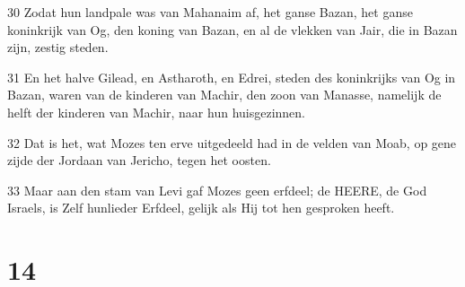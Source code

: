 \par 30 Zodat hun landpale was van Mahanaim af, het ganse Bazan, het ganse koninkrijk van Og, den koning van Bazan, en al de vlekken van Jair, die in Bazan zijn, zestig steden.
\par 31 En het halve Gilead, en Astharoth, en Edrei, steden des koninkrijks van Og in Bazan, waren van de kinderen van Machir, den zoon van Manasse, namelijk de helft der kinderen van Machir, naar hun huisgezinnen.
\par 32 Dat is het, wat Mozes ten erve uitgedeeld had in de velden van Moab, op gene zijde der Jordaan van Jericho, tegen het oosten.
\par 33 Maar aan den stam van Levi gaf Mozes geen erfdeel; de HEERE, de God Israels, is Zelf hunlieder Erfdeel, gelijk als Hij tot hen gesproken heeft.

\chapter{14}

